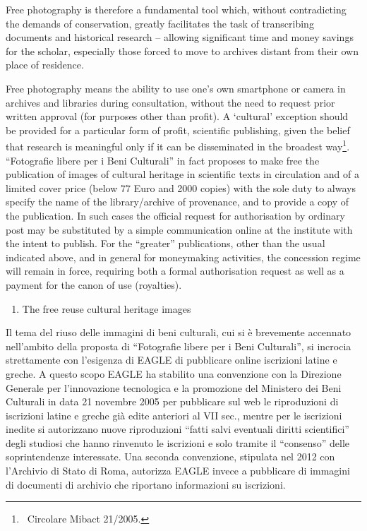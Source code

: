 \documentclass[amsthm,ebook]{saparticle}
\begin{document}
Free photography is therefore a fundamental tool which, without contradicting the demands of conservation, greatly
facilitates the task of transcribing documents and historical research – allowing significant time and money savings
for the scholar, especially those forced to move to archives distant from their own place of residence.

Free photography means the ability to use one’s own smartphone or camera in archives and libraries during consultation,
without the need to request prior written approval (for purposes other than profit). A ‘cultural’ exception should be
provided for a particular form of profit, scientific publishing, given the belief that research is meaningful only if
it can be disseminated in the broadest way\footnote{\ Circolare Mibact 21/2005.}. “Fotografie libere per i Beni
Culturali” in fact proposes to make free the publication of images of cultural heritage in scientific texts in
circulation and of a limited cover price (below 77 Euro and 2000 copies) with the sole duty to always specify the name
of the library/archive of provenance, and to provide a copy of the publication. In such cases the official request for
authorisation by ordinary post may be substituted by a simple communication online at the institute with the intent to
publish. For the “greater” publications, other than the usual indicated above, and in general for moneymaking
activities, the concession regime will remain in force, requiring both a formal authorisation request as well as a
payment for the canon of use (royalties).


\bigskip


\bigskip

\begin{enumerate}
\item The free reuse cultural heritage images
\end{enumerate}
Il tema del riuso delle immagini di beni culturali, cui si è brevemente accennato nell’ambito della proposta di
“Fotografie libere per i Beni Culturali”, si incrocia strettamente con l’esigenza di EAGLE di pubblicare online
iscrizioni latine e greche. A questo scopo EAGLE ha stabilito una convenzione con la Direzione Generale per
l’innovazione tecnologica e la promozione del Ministero dei Beni Culturali in data 21 novembre 2005 per pubblicare sul
web le riproduzioni di iscrizioni latine e greche già edite anteriori al VII sec., mentre per le iscrizioni inedite si
autorizzano nuove riproduzioni “fatti salvi eventuali diritti scientifici” degli studiosi che hanno rinvenuto le
iscrizioni e solo tramite il “consenso” delle soprintendenze interessate. Una seconda convenzione, stipulata nel 2012
con l’Archivio di Stato di Roma, autorizza EAGLE invece a pubblicare di immagini di documenti di archivio che riportano
informazioni su iscrizioni.
\end{document}

